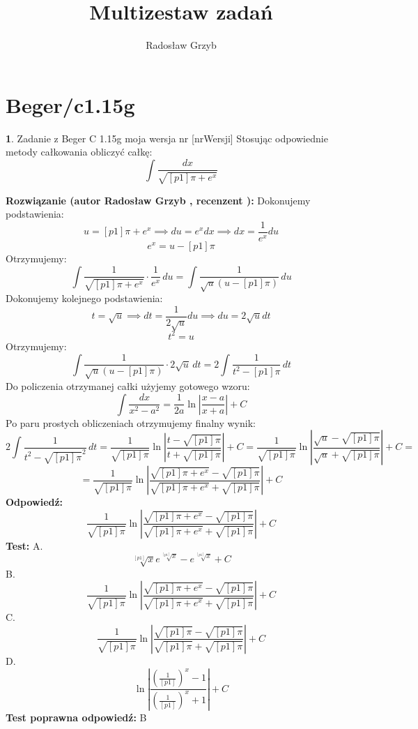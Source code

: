 \documentclass[12pt, a4paper]{article}
\title{Multizestaw zadań}
\author{Radosław Grzyb}
\date{}
\theoremstyle{definition} %
\newtheorem{zad}{}
\newcommand{\kategoria}[1]{\section{#1}} %
\newcommand{\zadStart}[1]{\begin{zad}#1\newline} %
\newcommand{\zadStop}{\end{zad}}   %
\newcommand{\rozwStart}[2]{\noindent \textbf{Rozwiązanie (autor #1 , recenzent #2): }\newline} %
\newcommand{\rozwStop}{\newline}                                            %
\newcommand{\odpStart}{\noindent \textbf{Odpowiedź:}\newline}    %
\newcommand{\odpStop}{\newline}                                             %
\newcommand{\testStart}{\noindent \textbf{Test:}\newline} %
\newcommand{\testStop}{\newline} %
\newcommand{\kluczStart}{\noindent \textbf{Test poprawna odpowiedź:}\newline} %
\newcommand{\kluczStop}{\newline} %
\begin{document}
\maketitle
\kategoria{Beger/c1.15g}
\zadStart{Zadanie z Beger C 1.15g moja wersja nr [nrWersji]}
Stosując odpowiednie metody całkowania obliczyć całkę:
$$\int \frac{dx}{\sqrt{[p1]\pi+e^x}}$$
\zadStop
\rozwStart{Radosław Grzyb}{}
Dokonujemy podstawienia:
$$u=[p1]\pi+e^x \implies du=e^x dx\implies dx=\frac{1}{e^x}du$$
$$e^x=u-[p1]\pi$$
Otrzymujemy:
$$\int \frac{1}{\sqrt{[p1]\pi+e^x}}\cdot\frac{1}{e^x}\,du=\int \frac{1}{\sqrt{u}(u-[p1]\pi)}\,du$$
Dokonujemy kolejnego podstawienia:
$$t=\sqrt{u} \implies dt=\frac{1}{2\sqrt{u}}du\implies du=2\sqrt{u}dt$$
$$t^2=u$$
Otrzymujemy:
$$\int \frac{1}{\sqrt{u}(u-[p1]\pi)}\cdot2\sqrt{u}\,dt=2\int\frac{1}{t^2-[p1]\pi}\,dt$$
Do policzenia otrzymanej całki użyjemy gotowego wzoru: $$\int\frac{dx}{x^2-a^2}=\frac{1}{2a}\ln\left|\frac{x-a}{x+a}\right|+C$$
Po paru prostych obliczeniach otrzymujemy finalny wynik:
$$2\int\frac{1}{t^2-\sqrt{[p1]\pi}^2}\,dt=\frac{1}{\sqrt{[p1]\pi}}\ln\left|\frac{t-\sqrt{[p1]\pi}}{t+\sqrt{[p1]\pi}}\right|+C=\frac{1}{\sqrt{[p1]\pi}}\ln\left|\frac{\sqrt{u}-\sqrt{[p1]\pi}}{\sqrt{u}+\sqrt{[p1]\pi}}\right|+C=$$
$$=\frac{1}{\sqrt{[p1]\pi}}\ln\left|\frac{\sqrt{[p1]\pi+e^x}-\sqrt{[p1]\pi}}{\sqrt{[p1]\pi+e^x}+\sqrt{[p1]\pi}}\right|+C$$
\rozwStop
\odpStart
$$\frac{1}{\sqrt{[p1]\pi}}\ln\left|\frac{\sqrt{[p1]\pi+e^x}-\sqrt{[p1]\pi}}{\sqrt{[p1]\pi+e^x}+\sqrt{[p1]\pi}}\right|+C$$
\odpStop
\testStart
A.$$\sqrt[[p1]]{x}e^{\sqrt[[p1]]{x}}-e^{\sqrt[[p1]]{x}}+C$$
B.$$\frac{1}{\sqrt{[p1]\pi}}\ln\left|\frac{\sqrt{[p1]\pi+e^x}-\sqrt{[p1]\pi}}{\sqrt{[p1]\pi+e^x}+\sqrt{[p1]\pi}}\right|+C$$
C.$$\frac{1}{\sqrt{[p1]\pi}}\ln\left|\frac{\sqrt{[p1]\pi}-\sqrt{[p1]\pi}}{\sqrt{[p1]\pi}+\sqrt{[p1]\pi}}\right|+C$$
D.$$\ln\left|\frac{\left(\frac{1}{[p1]}\right)^x-1}{\left(\frac{1}{[p1]}\right)^x+1}\right|+C$$
\testStop
\kluczStart
B
\kluczStop
\end{document}
